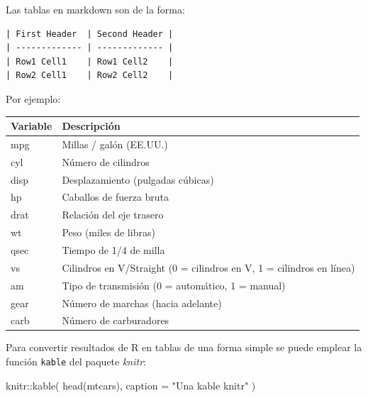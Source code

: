 \documentclass[
]{book}
\newenvironment{Shaded}{\begin{snugshade}}{\end{snugshade}}
\newcommand{\AttributeTok}[1]{\textcolor[rgb]{0.77,0.63,0.00}{#1}}
\newcommand{\FunctionTok}[1]{\textcolor[rgb]{0.00,0.00,0.00}{#1}}
\newcommand{\NormalTok}[1]{#1}
\newcommand{\SpecialCharTok}[1]{\textcolor[rgb]{0.00,0.00,0.00}{#1}}
\newcommand{\StringTok}[1]{\textcolor[rgb]{0.31,0.60,0.02}{#1}}
\theoremstyle{break}
\theoremstyle{nonumberplain}
\begin{document}
Las tablas en markdown son de la forma:

\begin{verbatim}
| First Header  | Second Header |
| ------------- | ------------- |
| Row1 Cell1    | Row1 Cell2    |
| Row2 Cell1    | Row2 Cell2    |
\end{verbatim}

Por ejemplo:

\begin{longtable}[]{@{}ll@{}}
\toprule
Variable & Descripción \\
\midrule
\endhead
mpg & Millas / galón (EE.UU.) \\
cyl & Número de cilindros \\
disp & Desplazamiento (pulgadas cúbicas) \\
hp & Caballos de fuerza bruta \\
drat & Relación del eje trasero \\
wt & Peso (miles de libras) \\
qsec & Tiempo de 1/4 de milla \\
vs & Cilindros en V/Straight (0 = cilindros en V, 1 = cilindros en línea) \\
am & Tipo de transmisión (0 = automático, 1 = manual) \\
gear & Número de marchas (hacia adelante) \\
carb & Número de carburadores \\
\bottomrule
\end{longtable}

Para convertir resultados de R en tablas de una forma simple se puede emplear la función \texttt{kable} del paquete \emph{knitr}:

\begin{Shaded}
\begin{Highlighting}[]
\NormalTok{knitr}\SpecialCharTok{::}\FunctionTok{kable}\NormalTok{(}
  \FunctionTok{head}\NormalTok{(mtcars), }
  \AttributeTok{caption =} \StringTok{"Una kable knitr"}
\NormalTok{)}
\end{Highlighting}
\end{Shaded}
\end{document}
